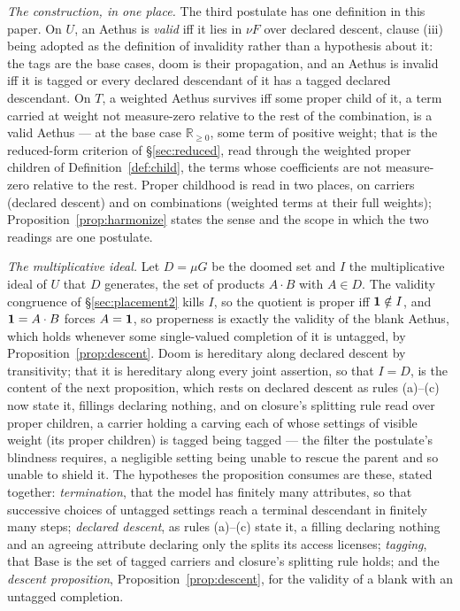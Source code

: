 \noindent\emph{The construction, in one place.} The third postulate has one definition in this paper. On $U$, an Aethus is \emph{valid} iff it lies in $\nu F$ over declared descent, clause (iii) being adopted as the definition of invalidity rather than a hypothesis about it: the tags are the base cases, doom is their propagation, and an Aethus is invalid iff it is tagged or every declared descendant of it has a tagged declared descendant. On $T$, a weighted Aethus survives iff some proper child of it, a term carried at weight not measure-zero relative to the rest of the combination, is a valid Aethus --- at the base case $\mathbb{R}_{\ge 0}$, some term of positive weight; that is the reduced-form criterion of §\ref{sec:reduced}, read through the weighted proper children of Definition~\ref{def:child}, the terms whose coefficients are not measure-zero relative to the rest. Proper childhood is read in two places, on carriers (declared descent) and on combinations (weighted terms at their full weights); Proposition~\ref{prop:harmonize} states the sense and the scope in which the two readings are one postulate.

\noindent\emph{The multiplicative ideal.} Let $D = \mu G$ be the doomed set and $I$ the multiplicative ideal of $U$ that $D$ generates, the set of products $A \cdot B$ with $A \in D$. The validity congruence of §\ref{sec:placement2} kills $I$, so the quotient is proper iff $\mathbf{1} \notin I$, and $\mathbf{1} = A \cdot B$ forces $A = \mathbf{1}$, so properness is exactly the validity of the blank Aethus, which holds whenever some single-valued completion of it is untagged, by Proposition~\ref{prop:descent}. Doom is hereditary along declared descent by transitivity; that it is hereditary along every joint assertion, so that $I = D$, is the content of the next proposition, which rests on declared descent as rules (a)--(c) now state it, fillings declaring nothing, and on closure's splitting rule read over proper children, a carrier holding a carving each of whose settings of visible weight (its proper children) is tagged being tagged --- the filter the postulate's blindness requires, a negligible setting being unable to rescue the parent and so unable to shield it. The hypotheses the proposition consumes are these, stated together: \emph{termination}, that the model has finitely many attributes, so that successive choices of untagged settings reach a terminal descendant in finitely many steps; \emph{declared descent}, as rules (a)--(c) state it, a filling declaring nothing and an agreeing attribute declaring only the splits its access licenses; \emph{tagging}, that $\mathrm{Base}$ is the set of tagged carriers and closure's splitting rule holds; and the \emph{descent proposition}, Proposition~\ref{prop:descent}, for the validity of a blank with an untagged completion.

